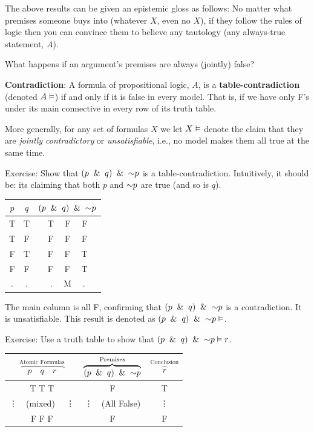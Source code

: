 \documentclass[options]{philosophersimprint}
\theoremstyle{definition}
\begin{document}
The above results can be given an epistemic gloss as follows: No matter what premises someone buys into (whatever $X$, even no $X$), if they follow the rules of logic then you can convince them to believe any tautology (any always-true statement, $A$).

What happens if an argument's premises are always (jointly) false?

\textbf{Contradiction}: A formula of propositional logic, $A$, is a \textbf{table-contradiction} (denoted $A\vDash$) if and only if it is false in every model. That is, if we have only F's under its main connective in every row of its truth table.

More generally, for any set of formulas $X$ we let $X\vDash$ denote the claim that they are \textit{jointly contradictory} or \textit{unsatisfiable}, i.e., no model makes them all true at the same time.

Exercise: Show that $(p \ \mathbin{\&} \   q)\ \mathbin{\&} \   \mathord{\sim} p$ is a table-contradiction. Intuitively, it should be: its claiming that both $p$ and $\mathord{\sim} p$ are true (and so is $q$).

\begin{table}[h!]
    \centering
    \begin{tabular}{c c | c}
        $p$ & $q$ & $(p \ \mathbin{\&} \  q) \ \mathbin{\&} \  \mathord{\sim} p$ \\
        \hline
        T & T & \quad T \quad \ \ F \ \  F \\
        T & F & \quad F \quad \ \ F \ \  F \\
        F & T & \quad F \quad \ \ F \ \  T \\
        F & F & \quad F \quad \ \ F \ \  T \\
        \hline
        $.$ & $.$ & \quad $.$ \quad \ \ M \ \  $.$ \\
    \end{tabular}
\end{table}
The main column is all F, confirming that $(p \ \mathbin{\&} \  q) \ \mathbin{\&} \  \mathord{\sim} p$ is a contradiction. It is unsatisfiable. This result is denoted as $(p \ \mathbin{\&} \  q) \ \mathbin{\&} \  \mathord{\sim} p \vDash$.

Exercise: Use a truth table to show that $(p \ \mathbin{\&} \  q) \ \mathbin{\&} \  \mathord{\sim} p \vDash r$.
\begin{table}[h!]
    \centering
    \begin{tabular}{c | c | c}
        $\overbrace{\quad p \quad q \quad r\quad}^\text{Atomic Formulas}$ & $\overbrace{(p \ \mathbin{\&} \  q) \ \mathbin{\&} \  \mathord{\sim} p }^\text{Premises}$ & $\overbrace{ r }^\text{Conclusion}$\\
        \hline
        T \quad T \quad T & F & T\\
        \vdots \ \ (mixed) \ \ \vdots & \qquad\qquad\quad\vdots \ \ (All False) & \vdots \\
        F \quad F \quad F & F & F\\
    \end{tabular}
\end{table}
\end{document}
